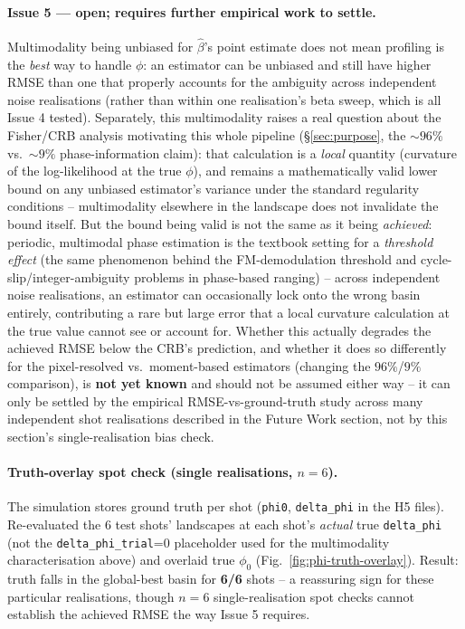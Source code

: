 \documentclass[11pt,a4paper]{article}
\newcommand{\code}[1]{\texttt{#1}}
\begin{document}
\paragraph{Issue 5 --- open; requires further empirical work to settle.}
Multimodality being unbiased for $\hat\beta$'s point estimate does not mean
profiling is the \emph{best} way to handle $\phi$: an estimator can be
unbiased and still have higher RMSE than one that properly accounts for
the ambiguity across independent noise realisations (rather than within
one realisation's beta sweep, which is all Issue 4 tested). Separately,
this multimodality raises a real question about the Fisher/CRB analysis
motivating this whole pipeline (\S\ref{sec:purpose}, the $\sim\!96\%$ vs.\
$\sim\!9\%$ phase-information claim): that calculation is a \emph{local}
quantity (curvature of the log-likelihood at the true $\phi$), and remains
a mathematically valid lower bound on any unbiased estimator's variance
under the standard regularity conditions -- multimodality elsewhere in the
landscape does not invalidate the bound itself. But the bound being valid
is not the same as it being \emph{achieved}: periodic, multimodal phase
estimation is the textbook setting for a \emph{threshold effect}
(the same phenomenon behind the FM-demodulation threshold and
cycle-slip/integer-ambiguity problems in phase-based ranging) -- across
independent noise realisations, an estimator can occasionally lock onto
the wrong basin entirely, contributing a rare but large error that a local
curvature calculation at the true value cannot see or account for. Whether
this actually degrades the achieved RMSE below the CRB's prediction, and
whether it does so differently for the pixel-resolved vs.\ moment-based
estimators (changing the $96\%$/$9\%$ comparison), is \textbf{not yet
known} and should not be assumed either way -- it can only be settled by
the empirical RMSE-vs-ground-truth study across many independent shot
realisations described in the Future Work section, not by this section's
single-realisation bias check.

\paragraph{Truth-overlay spot check (single realisations, $n=6$).} The
simulation stores ground truth per shot (\code{phi0}, \code{delta\_phi} in
the H5 files). Re-evaluated the 6 test shots' landscapes at each shot's
\emph{actual} true \code{delta\_phi} (not the \code{delta\_phi\_trial}=0
placeholder used for the multimodality characterisation above) and
overlaid true $\phi_0$ (Fig.~\ref{fig:phi-truth-overlay}). Result: truth
falls in the global-best basin for \textbf{6/6} shots -- a reassuring
sign for these particular realisations, though $n=6$ single-realisation
spot checks cannot establish the achieved RMSE the way Issue 5 requires.
\end{document}

